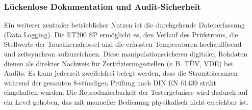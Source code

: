 \subsubsection{Lückenlose Dokumentation und Audit-Sicherheit}
Ein weiterer zentraler betrieblicher Nutzen ist die durchgehende Datenerfassung (Data Logging). Die ET200 SP ermöglicht es, den Verlauf des Prüfstroms, die Stellwerte der Tauchkerndrossel und die erfassten Temperaturen hochauflösend und zeitsynchron aufzuzeichnen. Diese manipulationssicheren digitalen Rohdaten dienen als direkter Nachweis für Zertifizierungsstellen (z.\,B. TÜV, VDE) bei Audits. Es kann jederzeit zweifelsfrei belegt werden, dass die Stromtoleranzen während der gesamten $8$-stündigen Prüfung nach DIN EN 61439 strikt eingehalten wurden. Die Reproduzierbarkeit der Testergebnisse wird dadurch auf ein Level gehoben, das mit manueller Bedienung physikalisch nicht erreichbar ist.


